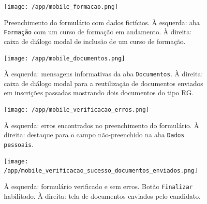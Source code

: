 \documentclass[
  10.5pt,				  %
	openright,			%
	twoside,			  %
  a5paper,
  chapter=TITLE,	%
	section=TITLE,	%
  hyphens,        %
	english,        %
	brazil          %
]{abntex2}
\begin{document}
\begin{figure}[!ht]
  \caption{\label{fig:mobile_formacao} Preenchimento do formulário com dados fictícios. À esquerda: aba \texttt{Formação} com um curso de formação em andamento. À direita: caixa de diálogo modal de inclusão de um curso de formação.}
  \begin{center}
    \texttt{[image: /app/mobile\_formacao.png]}
  \end{center}
\end{figure}

\begin{figure}[!ht]
  \caption{\label{fig:mobile_documentos} À esquerda: mensagens informativas da aba \texttt{Documentos}. À direita: caixa de diálogo modal para a reutilização de documentos enviados em inscrições passadas mostrando dois documentos do tipo RG.}
  \begin{center}
    \texttt{[image: /app/mobile\_documentos.png]}
  \end{center}
\end{figure}


\begin{figure}[!ht]
  \caption{\label{fig:mobile_verificacao_erros} À esquerda: erros encontrados no preenchimento do formulário. À direita: destaque para o campo não-preenchido na aba \texttt{Dados pessoais}.}
  \begin{center}
    \texttt{[image: /app/mobile\_verificacao\_erros.png]}
  \end{center}
\end{figure}

\begin{figure}[!ht]
  \caption{\label{fig:mobile_verificacao_sucesso_documentos_enviados} À esquerda: formulário verificado e sem erros. Botão \texttt{Finalizar} habilitado. À direita: tela de documentos enviados pelo candidato.}
  \begin{center}
    \texttt{[image: /app/mobile\_verificacao\_sucesso\_documentos\_enviados.png]}
  \end{center}
\end{figure}
\end{document}
